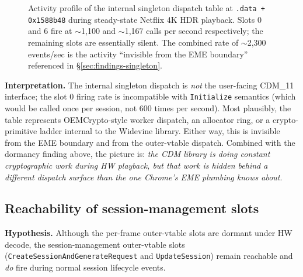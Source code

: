 \documentclass[11pt,letterpaper]{article}
\begin{document}
\begin{figure}[t]
\centering
{}
\caption{Activity profile of the internal singleton dispatch table at
\texttt{.data + 0x1588b48} during steady-state Netflix 4K HDR
playback.  Slots 0 and 6 fire at $\sim$1{,}100 and $\sim$1{,}167 calls
per second respectively; the remaining slots are essentially silent.
The combined rate of $\sim$2{,}300 events/sec is the activity
``invisible from the EME boundary'' referenced in
\S\ref{sec:findings-singleton}.}
\label{fig:singleton-rate}
\end{figure}

\textbf{Interpretation.}  The internal singleton dispatch is
\emph{not} the user-facing CDM\_11 interface; the slot 0 firing rate
is incompatible with \texttt{Initialize} semantics (which would be
called once per session, not 600 times per second).  Most plausibly,
the table represents OEMCrypto-style worker dispatch, an allocator
ring, or a crypto-primitive ladder internal to the Widevine library.
Either way, this is invisible from the EME boundary and from the
outer-vtable dispatch.  Combined with the dormancy finding above, the
picture is: \emph{the CDM library is doing constant cryptographic
work during HW playback, but that work is hidden behind a different
dispatch surface than the one Chrome's EME plumbing knows about}.

\subsection{Reachability of session-management slots}
\label{sec:findings-session}

\textbf{Hypothesis.}  Although the per-frame outer-vtable slots are
dormant under HW decode, the session-management outer-vtable slots
(\texttt{CreateSessionAndGenerateRequest} and
\texttt{UpdateSession}) remain reachable and \emph{do} fire during
normal session lifecycle events.
\end{document}
